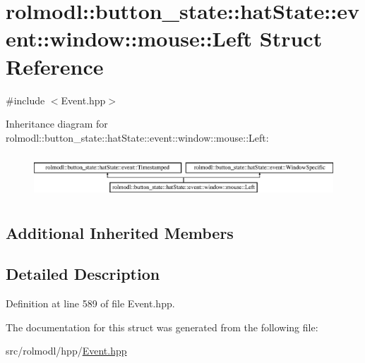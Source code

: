 \hypertarget{structrolmodl_1_1button__state_1_1hat_state_1_1event_1_1window_1_1mouse_1_1_left}{}\section{rolmodl\+::button\+\_\+state\+::hat\+State\+::event\+::window\+::mouse\+::Left Struct Reference}
\label{structrolmodl_1_1button__state_1_1hat_state_1_1event_1_1window_1_1mouse_1_1_left}


{\ttfamily \#include $<$Event.\+hpp$>$}

Inheritance diagram for rolmodl\+::button\+\_\+state\+::hat\+State\+::event\+::window\+::mouse\+::Left\+:\begin{figure}[H]
\begin{center}
\leavevmode
\includegraphics[height=1.651917cm]{structrolmodl_1_1button__state_1_1hat_state_1_1event_1_1window_1_1mouse_1_1_left}
\end{center}
\end{figure}
\subsection*{Additional Inherited Members}


\subsection{Detailed Description}


Definition at line 589 of file Event.\+hpp.



The documentation for this struct was generated from the following file\+:\begin{DoxyCompactItemize}
\item 
src/rolmodl/hpp/\mbox{\hyperlink{_event_8hpp}{Event.\+hpp}}\end{DoxyCompactItemize}
